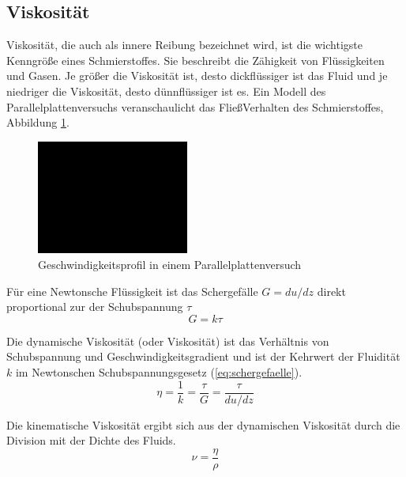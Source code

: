 \subsection*{Viskosität}
\label{sub:viskositaet}
Viskosität, die auch als innere Reibung bezeichnet wird, ist die wichtigste Kenngröße eines Schmierstoffes.
Sie beschreibt die Zähigkeit von Flüssigkeiten und Gasen.
Je größer die Viskosität ist, desto dickflüssiger ist das Fluid und je niedriger die Viskosität, desto dünnflüssiger ist es.
Ein Modell des Parallelplattenversuchs veranschaulicht das FließVerhalten des Schmierstoffes, Abbildung \ref{fig:geschwindigkeitsprofil_parallelplattenversuch}.
\begin{figure}[htb]
    \centering
    \includegraphics[width=5cm]{./images/blank_img.jpg}
    \caption{Geschwindigkeitsprofil in einem Parallelplattenversuch}
    \label{fig:geschwindigkeitsprofil_parallelplattenversuch}
\end{figure}

Für eine Newtonsche Flüssigkeit ist das Schergefälle $G = du/dz$ direkt proportional zur der Schubspannung $\tau$
\begin{equation}
    G = k  \tau
    \label{eq:schergefaelle}
\end{equation}

Die dynamische Viskosität (oder Viskosität) ist das Verhältnis von Schubspannung und Geschwindigkeitsgradient und ist der Kehrwert der Fluidität $k$ im Newtonschen Schubspannungsgesetz (\ref{eq:schergefaelle}).
\begin{equation}
    \eta = \frac{1}{k} = \frac{\tau}{G} = \frac{\tau}{du/dz}
    \label{eq:dynamische_viskositaet}
\end{equation}

Die kinematische Viskosität ergibt sich aus der dynamischen Viskosität durch die Division mit der Dichte des Fluids.
\begin{equation}
    \nu = \frac{\eta}{\rho}
    \label{eq:kinematische_viskotitaet}
\end{equation}

